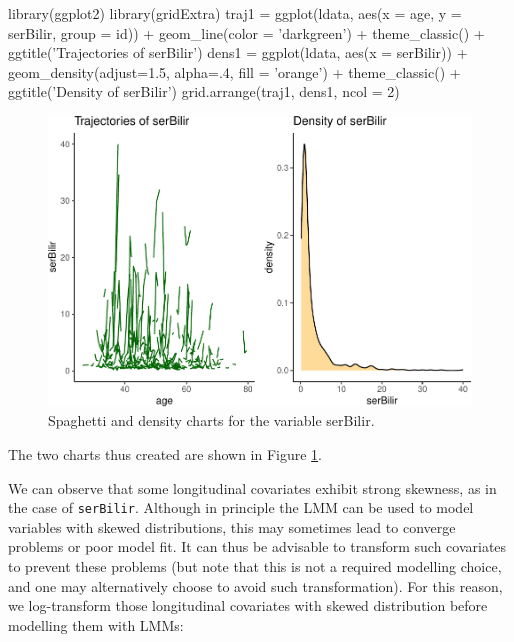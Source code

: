 \begin{Schunk}
\begin{Sinput}
library(ggplot2)
library(gridExtra)
traj1 = ggplot(ldata, aes(x = age, y = serBilir, group = id)) + 
  geom_line(color = 'darkgreen') + theme_classic() + ggtitle('Trajectories of serBilir')
dens1 = ggplot(ldata, aes(x = serBilir)) + 
  geom_density(adjust=1.5, alpha=.4, fill = 'orange') + theme_classic() + 
  ggtitle('Density of serBilir')
grid.arrange(traj1, dens1, ncol = 2)
\end{Sinput}
\begin{figure}[htbp]

{\centering \includegraphics[width=5in]{pencal-RJ_files/figure-latex/spaghetti-1} 

}

\caption[Spaghetti and density charts  for the variable serBilir]{Spaghetti and density charts  for the variable serBilir.}\label{fig:spaghetti}
\end{figure}
\end{Schunk}

The two charts thus created are shown in Figure \ref{fig:spaghetti}.

We can observe that some longitudinal covariates exhibit strong
skewness, as in the case of \texttt{serBilir}. Although in principle the
LMM can be used to model variables with skewed distributions, this may
sometimes lead to converge problems or poor model fit. It can thus be
advisable to transform such covariates to prevent these problems (but
note that this is not a required modelling choice, and one may
alternatively choose to avoid such transformation). For this reason, we
log-transform those longitudinal covariates with skewed distribution
before modelling them with LMMs:

